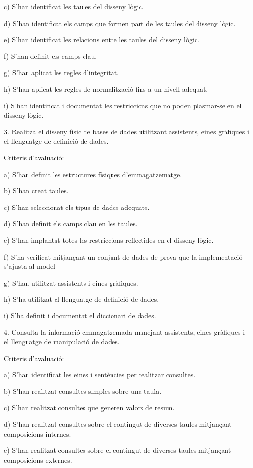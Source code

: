 \documentclass[catalan, a4paper, 12pt, titlepage]{article}
\begin{document}
c) S'han identificat les taules del disseny lògic.

d) S'han identificat els camps que formen part de les taules del disseny lògic.

e) S'han identificat les relacions entre les taules del disseny lògic.

f) S'han definit els camps clau.

g) S'han aplicat les regles d'integritat.

h) S'han aplicat les regles de normalització fins a un nivell adequat.

i) S'han identificat i documentat les restriccions que no poden plasmar-se en el disseny lògic.

3. Realitza el disseny físic de bases de dades utilitzant assistents, eines gràfiques i el llenguatge de definició de dades.

Criteris d'avaluació:

a) S'han definit les estructures físiques d'emmagatzematge.

b) S'han creat taules.

c) S'han seleccionat els tipus de dades adequats.

d) S'han definit els camps clau en les taules.

e) S'han implantat totes les restriccions reflectides en el disseny lògic.

f) S'ha verificat mitjançant un conjunt de dades de prova que la implementació s'ajusta al model.

g) S'han utilitzat assistents i eines gràfiques.

h) S'ha utilitzat el llenguatge de definició de dades.

i) S'ha definit i documentat el diccionari de dades.

4. Consulta la informació emmagatzemada manejant assistents, eines gràfiques i el llenguatge de manipulació de dades.

Criteris d'avaluació:

a) S'han identificat les eines i sentències per realitzar consultes.

b) S'han realitzat consultes simples sobre una taula.

c) S'han realitzat consultes que generen valors de resum.

d) S'han realitzat consultes sobre el contingut de diverses taules mitjançant composicions internes.

e) S'han realitzat consultes sobre el contingut de diverses taules mitjançant composicions externes.
\end{document}
